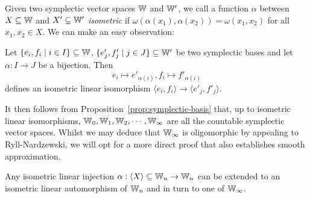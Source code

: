 \color{black}
Given two symplectic vector spaces $\mathbb{W}$ and $\mathbb{W}'$,
we call a function $\alpha$ between $X \subseteq \mathbb{W}$ and $X' \subseteq \mathbb{W}'$ \emph{isometric} if 
$\omega(\alpha(x_1), \alpha(x_2)) = \omega(x_1, x_2)$ for all $x_1, x_2 \in X$.
We can make an easy observation:
\begin{lemma}\label{lem:symplectic-basis-gives-isometry}
Let $\{e_i, f_i \mid i \in I\} \subseteq \mathbb{W}$, $\{e'_j, f'_j \mid j \in J\} \subseteq \mathbb{W}'$ be two symplectic bases
and let $\alpha : I \to J$ be a bijection.
Then 
\[
    e_i \mapsto e'_{\alpha(i)}, f_i \mapsto f'_{\alpha(i)}
\]
defines an isometric linear isomorphism $\langle e_i, f_i \rangle \to \langle e'_j, f'_j \rangle$.
\end{lemma}

It then follows from Proposition~\ref{prop:symplectic-basis} that, 
up to isometric linear isomorphisms, 
$\mathbb{W}_0, \mathbb{W}_1, \mathbb{W}_2, \cdots, \mathbb{W}_\infty$ are all the countable symplectic vector spaces.
Whilst we may deduce that $\mathbb{W}_\infty$ is oligomorphic by appealing to Ryll-Nardzewski,
we will opt for a more direct proof that also establishes smooth approximation.

\begin{proposition} \label{prop:symplectic-witt-extension}
    Any isometric linear injection $\alpha : \langle X \rangle \subseteq \mathbb{W}_n \to \mathbb{W}_n$ 
    can be extended to an isometric linear automorphism of $\mathbb{W}_n$
    and in turn to one of $\mathbb{W}_\infty$.
\end{proposition}

